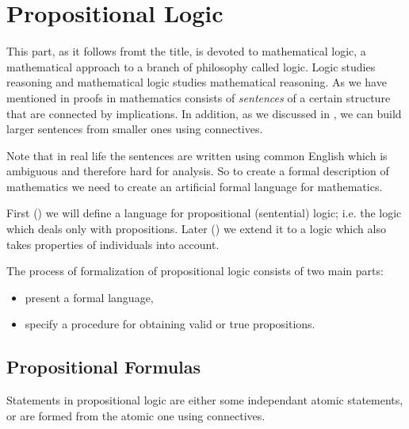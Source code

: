 \chapter{Propositional Logic}
\label{chapter:propositional-logic}

This part, as it follows fromt the title, is devoted to mathematical logic,
a mathematical approach to a branch of philosophy called logic. Logic studies
reasoning and mathematical logic studies mathematical reasoning. As we have
mentioned in  proofs in mathematics consists of
\emph{sentences} of a certain structure that are connected by implications.
In addition,  as we discussed in , we can build larger
sentences from smaller ones using connectives.

Note that in real life the sentences are written using common English which is
ambiguous and therefore hard for analysis.
So to create a formal description of mathematics we need to create an
artificial formal language for mathematics.

First () we will define a language for
propositional (sentential) logic; i.e. the logic which deals only with
propositions. Later () we extend it to a logic
which also takes properties of individuals into account.


The process of formalization of propositional logic consists of two main parts:
\begin{itemize}
  \item present a formal language,
  \item specify a procedure for obtaining valid or true propositions.
\end{itemize}

\section{Propositional Formulas}


Statements in  propositional logic are either some independant atomic
statements, or are formed from the atomic one using connectives.

